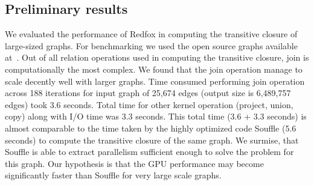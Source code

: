 \subsection{Preliminary results}
%
We evaluated the performance of Redfox in computing the transitive closure of large-sized graphs. 
For benchmarking we used the open source graphs available at~\cite{UF:SPMC}.
Out of all relation operations used in computing the transitive closure, join is computationally the most complex.
We found that the join operation manage to scale decently well with larger graphs.
Time consumed performing join operation across 188 iterations
for input graph of 25,674 edges (output size is 6,489,757 edges) took 3.6 seconds. Total time for other kernel operation (project, union, copy) along with I/O time was 3.3 seconds. This total time (3.6 + 3.3 seconds) is almost comparable to the time taken by the highly optimized code Souffle (5.6 seconds) to compute the transitive closure of the same graph. We surmise, that Souffle is able to extract parallelism sufficient enough to solve the problem for this graph. Our hypothesis is that the GPU performance may become significantly faster than Souffle for very large scale graphs.




